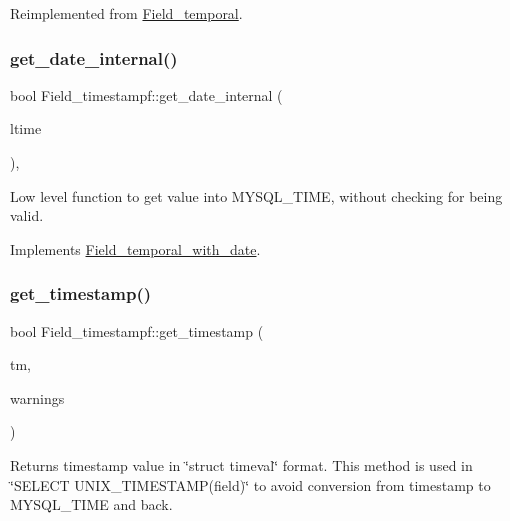 Reimplemented from \mbox{\hyperlink{classField__temporal_ac97041d80803a32c6fb9250bfa0c9200}{Field\+\_\+temporal}}.

\mbox{\label{classField__timestampf_a2f546414955a5ad516e77dc821ff5f47}} 
\subsubsection{\texorpdfstring{get\+\_\+date\+\_\+internal()}{get\_date\_internal()}}
{\footnotesize\ttfamily bool Field\+\_\+timestampf\+::get\+\_\+date\+\_\+internal (\begin{DoxyParamCaption}\item[{M\+Y\+S\+Q\+L\+\_\+\+T\+I\+ME $\ast$}]{ltime }\end{DoxyParamCaption})\hspace{0.3cm}{\ttfamily [protected]}, {\ttfamily [virtual]}}

Low level function to get value into M\+Y\+S\+Q\+L\+\_\+\+T\+I\+ME, without checking for being valid. 

Implements \mbox{\hyperlink{classField__temporal__with__date_aef905f77b5430dd2b3ef461ce916b4ef}{Field\+\_\+temporal\+\_\+with\+\_\+date}}.

\mbox{\label{classField__timestampf_a72149682778248e2084a68f08738c3a6}} 
\subsubsection{\texorpdfstring{get\+\_\+timestamp()}{get\_timestamp()}}
{\footnotesize\ttfamily bool Field\+\_\+timestampf\+::get\+\_\+timestamp (\begin{DoxyParamCaption}\item[{struct timeval $\ast$}]{tm,  }\item[{int $\ast$}]{warnings }\end{DoxyParamCaption})\hspace{0.3cm}{\ttfamily [virtual]}}

Returns timestamp value in \char`\"{}struct timeval\char`\"{} format. This method is used in \char`\"{}\+S\+E\+L\+E\+C\+T U\+N\+I\+X\+\_\+\+T\+I\+M\+E\+S\+T\+A\+M\+P(field)\char`\"{} to avoid conversion from timestamp to M\+Y\+S\+Q\+L\+\_\+\+T\+I\+ME and back. 

